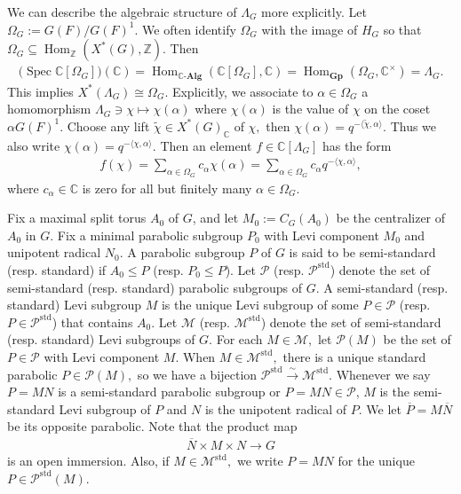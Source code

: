 \documentclass[10pt]{amsart}
\theoremstyle{definition}
\numberwithin{equation}{section}
\DeclareMathOperator{\Hom}{\mathrm{Hom}}
\DeclareMathOperator{\Spec}{\mathrm{Spec}}
\numberwithin{equation}{subsection}
\newcommand{\ZZ}{\mathbb{Z}}
\newcommand{\CC}{\mathbb{C}}
\begin{document}
 We can describe the algebraic structure of $\Lambda_G$ more explicitly. Let $\Omega_G := G(F)/G(F)^1$. We often identify $\Omega_G$ with the image of $H_G$ so that $\Omega_G\subseteq \Hom_{\ZZ}(X^*(G),\ZZ)$. Then
\begin{align*}
    \bigg(\Spec \CC[\Omega_G]\bigg)(\CC) = \Hom_{\CC\textrm{-}\textbf{Alg}}(\CC[\Omega_G],\CC) = \Hom_{\textbf{Gp}}(\Omega_G,\CC^\times) = \Lambda_G.
\end{align*}
This implies $X^*(\Lambda_G) \cong \Omega_G$. Explicitly, we associate to $\alpha\in\Omega_G$ a homomorphism $\Lambda_G\ni\chi\mapsto \chi(\alpha)$ where $\chi(\alpha)$ is the value of $\chi$ on the coset $\alpha G(F)^1$. Choose any lift $\tilde{\chi}\in X^\ast(G)_\CC$ of $\chi,$ then $\chi(\alpha)=q^{-\langle \tilde{\chi},\alpha\rangle}.$ Thus we also write $\chi(\alpha) =q^{-\langle\chi,\alpha\rangle}.$ Then an element $f\in \CC[\Lambda_G]$ has the form
\begin{align}\label{LambdaG:poly:supp}
    f(\chi) = \sum_{\alpha\in \Omega_G} c_\alpha \chi(\alpha) = \sum_{\alpha\in \Omega_G} c_\alpha q^{-\langle\chi,\alpha\rangle},
\end{align}
where $c_\alpha\in \CC$ is zero for all but finitely many $\alpha\in\Omega_G$. 


Fix a maximal split torus $A_0$ of $G$, and let $M_0:=C_G(A_0)$ be the centralizer of $A_0$ in $G$. Fix a minimal parabolic subgroup $P_0$ with Levi component $M_0$ and unipotent radical $N_0$. A parabolic subgroup $P$ of $G$ is said to be semi-standard (resp. standard) if $A_0\le P$ (resp. $P_0\le P$). Let $\mathcal{P}$ (resp. $\mathcal{P}^{\mathrm{std}}$) denote the set of semi-standard (resp. standard) parabolic subgroups of $G$. A semi-standard (resp. standard) Levi
subgroup $M$ is the unique Levi subgroup of some $P\in \mathcal{P}$ (resp. $P\in\mathcal{P}^{\mathrm{std}}$) that contains
$A_0$. Let $\mathcal{M}$ (resp. $\mathcal{M}^{\mathrm{std}}$) denote the set of semi-standard (resp. standard) Levi subgroups of $G$. For each $M\in \mathcal{M},$ let $\mathcal{P}(M)$ be the set of $P\in \mathcal{P}$ with Levi component $M$. When $M\in \mathcal{M}^{\mathrm{std}},$ there is a unique standard parabolic $P\in \mathcal{P}(M),$ so we have a bijection $\mathcal{P}^{\mathrm{std}}\stackrel{\sim}{\longrightarrow} \mathcal{M}^{\mathrm{std}}.$ Whenever we say $P=MN$ is a semi-standard parabolic subgroup or $P=MN\in \mathcal{P}$, $M$ is the semi-standard Levi subgroup of $P$ and $N$ is the unipotent radical of $P$. We let  $\overline{P}=M\overline{N}$ be its opposite parabolic. Note that the product map
\begin{align*}
    \overline{N}\times M\times N\longrightarrow G
\end{align*}
is an open immersion. Also, if $M\in \mathcal{M}^{\mathrm{std}},$ we write $P=MN$ for the unique $P\in \mathcal{P}^{\mathrm{std}}(M).$
\end{document}
